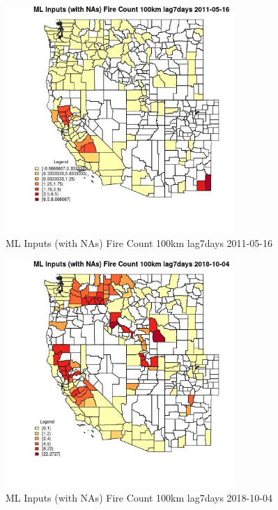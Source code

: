 \begin{figure} 
\centering  
\includegraphics[width=0.77\textwidth]{Code_Outputs/Report_ML_input_PM25_Step4_part_f_de_duplicated_aveswNAs_CountyFire_Count_100km_lag7daysMean2011-05-16.jpg} 
\caption{\label{fig:Report_ML_input_PM25_Step4_part_f_de_duplicated_aveswNAsCountyFire_Count_100km_lag7daysMean2011-05-16}ML Inputs (with NAs) Fire Count 100km lag7days 2011-05-16} 
\end{figure} 
 

\begin{figure} 
\centering  
\includegraphics[width=0.77\textwidth]{Code_Outputs/Report_ML_input_PM25_Step4_part_f_de_duplicated_aveswNAs_CountyFire_Count_100km_lag7daysMean2018-10-04.jpg} 
\caption{\label{fig:Report_ML_input_PM25_Step4_part_f_de_duplicated_aveswNAsCountyFire_Count_100km_lag7daysMean2018-10-04}ML Inputs (with NAs) Fire Count 100km lag7days 2018-10-04} 
\end{figure} 
 

